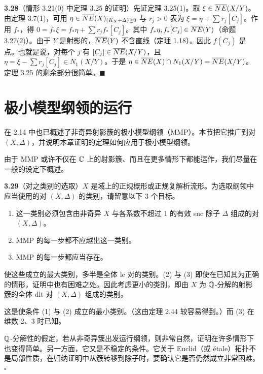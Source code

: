 \par\medskip\noindent\textbf{3.28}（情形 3.21(0) 中定理 3.25 的证明）\quad 先证定理 3.25(1)。取 $\xi\in\overline{NE}(X/Y)$。由定理 3.7(1)，可用 $\eta\in\overline{NE}(X)_{(K_X+\Delta)\ge 0}$ 与 $r_j>0$ 表为 $\xi=\eta+\sum r_j[C_j]$。作用 $f_*$，得 $0=f_*\xi=f_*\eta+\sum r_jf_*[C_j]$。其中 $f_*\eta,f_*[C_j]\in\overline{NE}(Y)$（命题 3.27(2)）。由于 $Y$ 是射影的，$\overline{NE}(Y)$ 不含直线（定理 1.18）。因此 $f(C_j)$ 是点。也就是说，对每个 $j$ 有 $[C_j]\in\overline{NE}(X/Y)$，且 $\eta=\xi-\sum r_j[C_j]\in N_1(X/Y)$。于是 $\eta\in\overline{NE}(X)\cap N_1(X/Y)=\overline{NE}(X/Y)$。定理 3.25 的剩余部分很简单。\hfill$\blacksquare$

\section{极小模型纲领的运行}

在 2.14 中也已概述了非奇异射影簇的极小模型纲领（MMP）。本节把它推广到对 $(X,\Delta)$，并说明本章证明的定理如何应用于极小模型纲领。

由于 MMP 或许不仅在 $\mathbb{C}$ 上的射影簇、而且在更多情形下都能运作，我们尽量在一般的设定下概述。

\par\medskip\noindent\textbf{3.29}（对之类别的选取）\quad $X$ 是域上的正规概形或正规复解析流形。为选取纲领中应当使用的对 $(X,\Delta)$ 的类别，请留意以下 3 个目标。
\begin{enumerate}[label=（\arabic*）,leftmargin=2.8em,itemsep=1pt,topsep=2pt,parsep=0pt]
\item 这一类别必须包含由非奇异 $X$ 与各系数不超过 $1$ 的有效 snc 除子 $\Delta$ 组成的对 $(X,\Delta)$。
\item MMP 的每一步都不应越出这一类别。
\item MMP 的每一步都应当存在。
\end{enumerate}
使这些成立的最大类别，多半是全体 lc 对的类别。(2) 与 (3) 即使在已知其为正确的情形，证明中也有困难之处。因此考虑更小的类别，即由 $X$ 为 $\mathbb{Q}$-分解的射影簇的全体 dlt 对 $(X,\Delta)$ 组成的类别。

这是使条件 (1) 与 (2) 成立的最小类别。（这由定理 2.44 较容易得到。）而 (3) 在维数 2、3 时已知。

$\mathbb{Q}$-分解性的假定，若从非奇异簇出发运行纲领，则非常自然，证明在许多情形下也变得简单。另一方面，它又是不稳定的条件。它关于 Euclid（或 étale）拓扑不是局部性质，在归纳证明中从簇转移到除子时，要确认它是否仍然成立非常困难。\hfill$\square$

